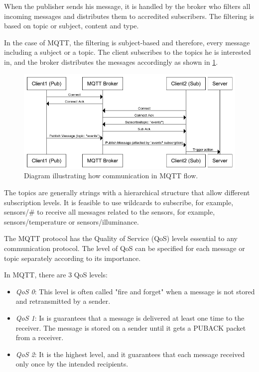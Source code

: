 When the publisher sends his message, it is handled by the broker who filters all incoming messages and distributes them to accredited subscribers. The filtering is based on topic or subject, content and type.

In the case of MQTT, the filtering is subject-based and therefore, every message including a subject or a topic. The client subscribes to the topics he is interested in, and the broker distributes the messages accordingly as shown in \cref{fig:MQTT_pub_sub_communication_diagram}.

\begin{figure}[H]
	\centering
	\includegraphics[width=\textwidth]{img/MQTT_pub_sub_communication_diagram.png}
	\caption{Diagram illustrating how communication in MQTT flow.}
	\label{fig:MQTT_pub_sub_communication_diagram}
  \end{figure}

The topics are generally strings with a hierarchical structure that allow different subscription levels. It is feasible to use wildcards to subscribe, for example, sensors/\# to receive all messages related to the sensors, for example, sensors/temperature or sensors/illuminance.

The MQTT protocol has the Quality of Service (QoS) levels essential to any communication protocol.  The level of QoS can be specified for each message or topic separately according to its importance.

In MQTT, there are 3 QoS levels:

\begin{itemize}
	\item \textit{QoS 0}: This level is often called "fire and forget" when a message is not stored and retransmitted by a sender.
	\item \textit{QoS 1}: Is is guarantees that a message is delivered at least one time to the receiver. The message is stored on a sender until it gets a PUBACK packet from a receiver.
	\item \textit{QoS 2}: It is the highest level, and it guarantees that each message received only once by the intended recipients.
\end{itemize}

